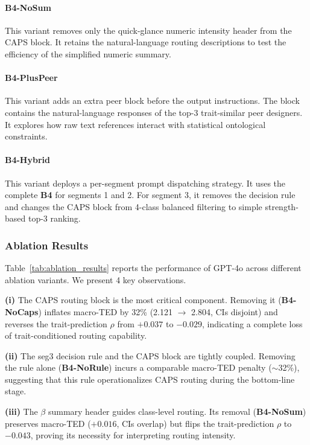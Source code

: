\documentclass[11pt]{article}
\begin{document}
\paragraph{B4-NoSum}
This variant removes only the quick-glance numeric intensity header from the CAPS block. It retains the natural-language routing descriptions to test the efficiency of the simplified numeric summary.

\paragraph{B4-PlusPeer}
This variant adds an extra peer block before the output instructions. The block contains the natural-language responses of the top-3 trait-similar peer designers. It explores how raw text references interact with statistical ontological constraints.

\paragraph{B4-Hybrid}
This variant deploys a per-segment prompt dispatching strategy. It uses the complete \textbf{B4} for segments 1 and 2. For segment 3, it removes the decision rule and changes the CAPS block from 4-class balanced filtering to simple strength-based top-3 ranking.

\subsubsection{Ablation Results}
Table~\ref{tab:ablation_results} reports the performance of GPT-4o across different ablation variants. We present 4 key observations. 

\textbf{(i)} The CAPS routing block is the most critical component. Removing it (\textbf{B4-NoCaps}) inflates macro-TED by 32\% (2.121 $\rightarrow$ 2.804, CIs disjoint) and reverses the trait-prediction $\rho$ from $+0.037$ to $-0.029$, indicating a complete loss of trait-conditioned routing capability. 

\textbf{(ii)} The seg3 decision rule and the CAPS block are tightly coupled. Removing the rule alone (\textbf{B4-NoRule}) incurs a comparable macro-TED penalty ($\sim$32\%), suggesting that this rule operationalizes CAPS routing during the bottom-line stage. 

\textbf{(iii)} The $\beta$ summary header guides class-level routing. Its removal (\textbf{B4-NoSum}) preserves macro-TED ($+0.016$, CIs overlap) but flips the trait-prediction $\rho$ to $-0.043$, proving its necessity for interpreting routing intensity. 
\end{document}
